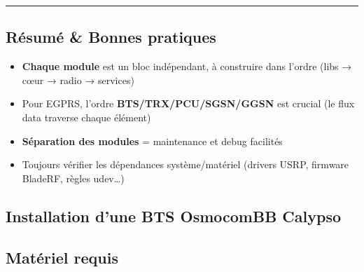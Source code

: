 \documentclass[
  french,
]{article}
\newenvironment{Shaded}{\begin{snugshade}}{\end{snugshade}}
\newcommand{\BuiltInTok}[1]{#1}
\newcommand{\CommentTok}[1]{\textcolor[rgb]{0.56,0.35,0.01}{\textit{#1}}}
\newcommand{\ExtensionTok}[1]{#1}
\newcommand{\FunctionTok}[1]{\textcolor[rgb]{0.13,0.29,0.53}{\textbf{#1}}}
\newcommand{\KeywordTok}[1]{\textcolor[rgb]{0.13,0.29,0.53}{\textbf{#1}}}
\newcommand{\StringTok}[1]{\textcolor[rgb]{0.31,0.60,0.02}{#1}}
\newcommand{\VariableTok}[1]{\textcolor[rgb]{0.00,0.00,0.00}{#1}}
\providecommand{\tightlist}{%
  \setlength{\itemsep}{0pt}\setlength{\parskip}{0pt}}
\begin{document}
\begin{Shaded}
\end{Shaded}

\begin{center}\rule{0.5\linewidth}{0.5pt}\end{center}

\subsection{Résumé \& Bonnes
pratiques}\label{ruxe9sumuxe9-bonnes-pratiques}

\begin{itemize}
\tightlist
\item
  \textbf{Chaque module} est un bloc indépendant, à construire dans
  l'ordre (libs → cœur → radio → services)
\item
  Pour EGPRS, l'ordre \textbf{BTS/TRX/PCU/SGSN/GGSN} est crucial (le
  flux data traverse chaque élément)
\item
  \textbf{Séparation des modules} = maintenance et debug facilités
\item
  Toujours vérifier les dépendances système/matériel (drivers USRP,
  firmware BladeRF, règles udev\ldots)
\end{itemize}

\subsection{Installation d'une BTS OsmocomBB
Calypso}\label{installation-dune-bts-osmocombb-calypso}

\subsection{Matériel requis}\label{matuxe9riel-requis}
\end{document}
